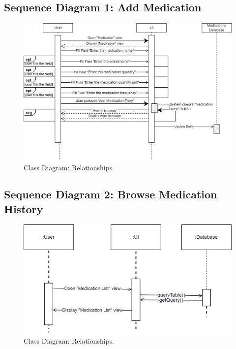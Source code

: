 \documentclass[11pt]{article}
\begin{document}
    \subsection{Sequence Diagram 1: Add Medication}\label{subsec:sequence-diagram-1:-add-medication}
    \begin{figure}[H]
        \centering
        \includegraphics[width=\textwidth]{Diagrams/Use Case Diagrams/Sequence diagram 1}
        \caption{Class Diagram: Relationships.}
        \label{fig:Sequence Diagram 1: Add Medication}
    \end{figure}

    \subsection{Sequence Diagram 2: Browse Medication History}\label{subsec:sequence-diagram-2:-browse-medication-history}
    \begin{figure}[H]
        \centering
        \includegraphics[width=\textwidth]{Diagrams/Use Case Diagrams/Sequence diagram 2}
        \caption{Class Diagram: Relationships.}
        \label{fig:Sequence Diagram 2: Browse Medication History}
    \end{figure}
\end{document}

